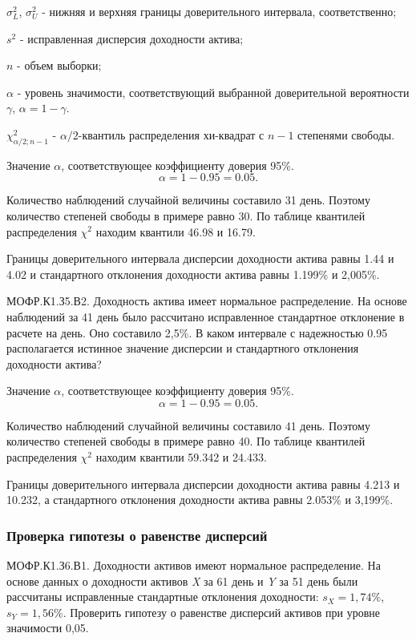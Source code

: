 \documentclass[12pt, table, a4paper,twoside]{exam}
\begin{document}
\begin{questions}
\begin{solution}[6em]
$\sigma_L^2$, $\sigma_U^2$ - нижняя и верхняя границы доверительного интервала, соответственно;

$s^2$ - исправленная дисперсия доходности актива;

$n$ - объем выборки;

$\alpha$ - уровень значимости, соответствующий выбранной доверительной вероятности $\gamma$, $\alpha=1-\gamma$. 

$\chi_{\alpha/2;n-1}^2$ - $\alpha/2$-квантиль распределения хи-квадрат с $n-1$ степенями свободы.

Значение $\alpha$, соответствующее коэффициенту доверия 95\%.
$$\alpha=1-0.95=0.05.$$

Количество наблюдений случайной величины составило 31 день. Поэтому количество степеней свободы в примере равно 30. По таблице квантилей распределения $\chi^2$ находим квантили 46.98 и 16.79.

Границы доверительного интервала дисперсии доходности актива равны 1.44 и 4.02 и стандартного отклонения доходности актива равны 1.199\% и 2,005\%.
\end{solution}

\question[10] МОФР.К1.З5.В2. Доходность актива имеет нормальное распределение. На основе наблюдений за 41 день было рассчитано исправленное стандартное отклонение в расчете на день. Оно составило 2,5\%. В каком интервале с надежностью 0.95 располагается истинное значение дисперсии и стандартного отклонения доходности актива?

\begin{solution}[6em]
	\raggedright

	Значение $\alpha$, соответствующее коэффициенту доверия 95\%.
	$$\alpha=1-0.95=0.05.$$
	
	Количество наблюдений случайной величины составило 41 день. Поэтому количество степеней свободы в примере равно 40. По таблице квантилей распределения $\chi^2$ находим квантили 59.342 и 24.433.
	
	Границы доверительного интервала дисперсии доходности актива равны 4.213 и 10.232, а стандартного отклонения доходности актива равны 2.053\% и 3,199\%.
\end{solution}

\subsubsection{Проверка гипотезы о равенстве дисперсий}
\question[10] МОФР.К1.З6.В1. Доходности активов имеют нормальное распределение. На основе данных о доходности активов \textit{X} за 61 день и \textit{Y} за 51 день были рассчитаны исправленные стандартные отклонения доходности: $s_X=1,74\%$, $s_Y = 1,56\%$. Проверить гипотезу о равенстве дисперсий активов при уровне значимости 0,05.


\end{questions}
\end{document}
